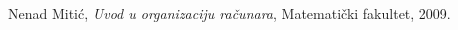 \documentclass[a4paper]{article}
\begin{document}
% 
% 


\newpage
\begin{thebibliography}{9}

  Nenad Mitić,
  \emph{Uvod u organizaciju računara},
  Matematički fakultet,
  2009.

\end{thebibliography}

%  
% 
\end{document}
